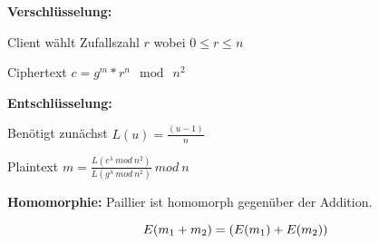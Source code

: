 \documentclass{beamer}
\begin{document}
\begin{frame}
		\textbf{Verschlüsselung:}
		\begin{arrowlist}
			\item Client wählt Zufallszahl $ r $ wobei $ 0 \leq r \leq n $
			\item Ciphertext $ c = g^{m}*r^{n} \mod\ n^{2} $
		\end{arrowlist}
		

		\textbf{Entschlüsselung:}
		\begin{arrowlist}
			\item Benötigt zunächst $ L(u)= \frac{(u-1)}{n} $
			\item Plaintext $ m = \frac{L(c^{\lambda} \ mod \ n^{2}) }{L(g^{\lambda} \ mod \ n^{2})} \ mod \ n $
		\end{arrowlist}


		\textbf{Homomorphie:}
		Paillier ist homomorph gegenüber der Addition.
		
		$$ E(m \textsubscript{1} + m \textsubscript{2}) = (E(m \textsubscript{1}) + E(m \textsubscript{2}))$$
\end{frame}
\end{document}
